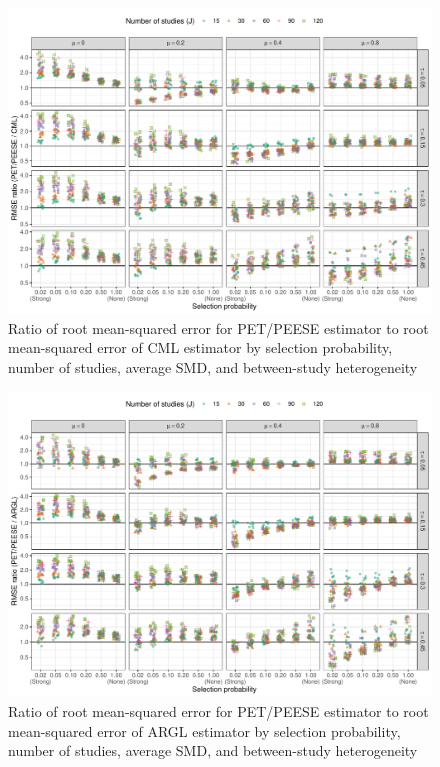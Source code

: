 \documentclass[
  american,
  man, donotrepeattitle,mask,floatsintext]{apa7}
\numberwithin{table}{section}
\numberwithin{equation}{section}
\numberwithin{figure}{section}
\begin{document}
\begin{figure}
\includegraphics{step-function-selection-models-supplementary-materials_files/figure-latex/rmse-PET-CML-1} \caption{Ratio of root mean-squared error for PET/PEESE estimator to root mean-squared error of CML estimator by selection probability, number of studies, average SMD, and between-study heterogeneity}\label{fig:rmse-PET-CML}
\end{figure}

\begin{figure}
\includegraphics{step-function-selection-models-supplementary-materials_files/figure-latex/rmse-PET-ARGL-1} \caption{Ratio of root mean-squared error for PET/PEESE estimator to root mean-squared error of ARGL estimator by selection probability, number of studies, average SMD, and between-study heterogeneity}\label{fig:rmse-PET-ARGL}
\end{figure}
\end{document}
